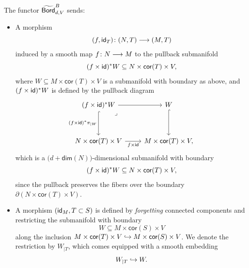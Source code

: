 \begin{definition}
    \noindent The functor $\widetilde{\operatorname{\mathsf{Bord}}}^{B}_{d,V}$ sends:
    \begin{itemize}
    \item[($\man$):] A morphism 
    \[
    (f,\mathsf{id}_{T})\colon (N,T) \longrightarrow (M,T)
    \]
    induced by a smooth map $f\colon N \longrightarrow M$ to the pullback submanifold 
    \[
    (f \times \operatorname{\sf id})^{*} W \subseteq N \times \mathsf{cor}(T) \times V,
    \]
    where $W\subseteq M\times \mathsf{cor}(T) \times V$ is a submanifold with boundary as above, and $(f\times \operatorname{\sf id})^\ast W$ is defined by the pullback diagram
    \begin{equation}
        \begin{tikzcd}[ampersand replacement=\&]
            {(f\times \id)^\ast W} \& {W} \\
            \\
            N\times \mathsf{cor}(T) \times V \& M\times \mathsf{cor}(T) \times V,
            \arrow[from=1-1, to=1-2]
            \arrow[hook, "(f\times \id)^\ast \pi_{|W}"',from=1-1, to=3-1]
            \arrow["\lrcorner"{anchor=center, pos=0.125}, draw=none, from=1-1, to=3-2]
            \arrow[hook, from=1-2, to=3-2]
            \arrow["f\times \id"', from=3-1, to=3-2]
        \end{tikzcd}
    \end{equation}
    which is a $\big(d + \mathsf{dim}(N)\big)$-dimensional submanifold with boundary
    \begin{equation}
        (f\times \operatorname{\sf id})^* W \subseteq N \times \mathsf{cor}(T) \times V,
    \end{equation}
    since the pullback preserves the fibers over the boundary $\partial (N \times \mathsf{cor}(T) \times V)$.

    \item[($\Int$):] A morphism $(\operatorname{\sf id}_M, T\subset S)$ is defined by \emph{forgetting} connected components and restricting the submanifold with boundary 
    \begin{equation}
        W \subseteq M \times \mathsf{cor}(S) \times V
    \end{equation}
    along the inclusion $M \times \mathsf{cor}(T)\times V \hookrightarrow M \times \mathsf{cor}(S)\times V$. We denote the restriction by $W_{|T}$, which comes equipped with a smooth embedding 
    \begin{equation}
        W_{|T} \hookrightarrow W.
    \end{equation}
    \end{itemize}  
\end{definition}

